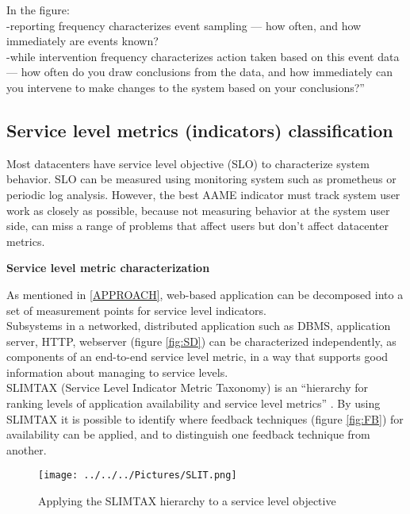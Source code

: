\documentclass[english]{tktltiki2}
\theoremstyle{definition}
\theoremstyle{remark}
\begin{document}
In the figure:\\
-reporting frequency characterizes event sampling — how often, and how immediately are events known?\\ -while intervention frequency characterizes action taken based on this event data — how often do you draw conclusions from the data, and how immediately can you intervene to make changes to the system based on your conclusions?”
\subsection{Service level metrics (indicators) classification}
Most datacenters have service level objective (SLO) to characterize system behavior.  SLO can be measured using monitoring system such as prometheus or periodic log analysis. However, the best AAME indicator must track system user work as closely as possible, because not measuring behavior at the system user side, can miss a range of problems that affect users but don’t affect datacenter metrics.

\begin{flushleft}
\textbf{Service level metric characterization}
\end{flushleft}
As mentioned in \ref{APPROACH}, web-based application can be decomposed
into a set of measurement points for service level indicators.\\
Subsystems in a networked, distributed application such as DBMS, application server, HTTP, webserver (figure \ref{fig:SD}) can be characterized independently, as components of an end-to-end service level metric, in a way that supports good information about managing to service levels.\\
SLIMTAX (Service Level Indicator Metric Taxonomy) is an “hierarchy for ranking levels of application availability and service level metrics” \cite{AAMES}. By using SLIMTAX it is possible to identify where feedback techniques (figure \ref{fig:FB}) for availability can be applied, and to distinguish one feedback technique from another.\\

 \begin{figure}[h!]
\texttt{[image: ../../../Pictures/SLIT.png]} 
\caption{Applying the SLIMTAX hierarchy to a service level objective \cite{AAMES}}
\label{fig:SLI} 
\end{figure}
\end{document}
